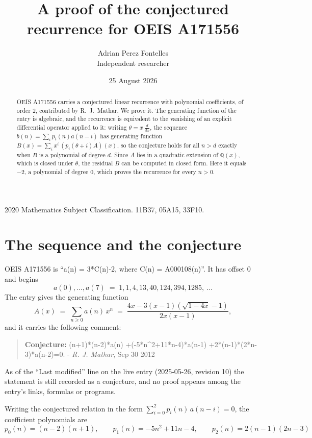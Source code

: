 \documentclass[11pt,a4paper]{article}
\title{A proof of the conjectured recurrence for OEIS A171556}
\author{Adrian Perez Fontelles\\ \small Independent researcher}
\date{25 August 2026}
\theoremstyle{plain}
\theoremstyle{definition}
\begin{document}
\maketitle

\begin{abstract}
OEIS A171556 carries a conjectured linear recurrence with polynomial coefficients, of
order 2, contributed by R.~J.~Mathar. We prove it. The generating function of the
entry is algebraic, and the recurrence is equivalent to the vanishing of an explicit
differential operator applied to it: writing $\theta=x\,\frac{d}{dx}$, the sequence
$b(n)=\sum_{i}p_{i}(n)a(n-i)$ has generating function
$B(x)=\sum_{i}x^{i}\,(p_{i}(\theta+i)A)(x)$, so the conjecture holds for all $n>d$ exactly
when $B$ is a polynomial of degree $d$. Since $A$ lies in a quadratic extension of
$\mathbb{Q}(x)$, which is closed under $\theta$, the residual $B$ can be computed in
closed form. Here it equals $-2$, a polynomial of degree $0$, which proves
the recurrence for every $n>0$.
\end{abstract}

\noindent\small 2020 Mathematics Subject Classification. 11B37, 05A15, 33F10.\normalsize

\section{The sequence and the conjecture}

OEIS A171556 is ``a(n) = 3*C(n)-2, where C(n) = A000108(n)''. It has offset $0$ and begins
\[
a(0),\dots,a(7)\;=\;1, 1, 4, 13, 40, 124, 394, 1285,\ \dots
\]
The entry gives the generating function
\begin{equation}\label{eq:gf}
A(x)\;=\;\sum_{n\ge 0} a(n)\,x^{n}\;=\;\frac{4 x - 3 \left(x - 1\right) \left(\sqrt{1 - 4 x} - 1\right)}{2 x \left(x - 1\right)} ,
\end{equation}
and it carries the following comment:
\begin{quote}\small
\textbf{Conjecture:} (n+1)*(n-2)*a(n) +(-5*n\^{}2+11*n-4)*a(n-1) +2*(n-1)*(2*n-3)*a(n-2)=0. - \emph{R. J. Mathar}, Sep 30 2012
\end{quote}
As of the ``Last modified'' line on the live entry (2025-05-26, revision 10) the
statement is still recorded as a conjecture, and no proof appears among the entry's links,
formulas or programs.

Writing the conjectured relation in the form $\sum_{i=0}^{2}p_{i}(n)\,a(n-i)=0$,
the coefficient polynomials are
\[
p_{0}(n)=\left(n - 2\right) \left(n + 1\right),\qquad p_{1}(n)=- 5 n^{2} + 11 n - 4,\qquad p_{2}(n)=2 \left(n - 1\right) \left(2 n - 3\right)
\]
\end{document}

